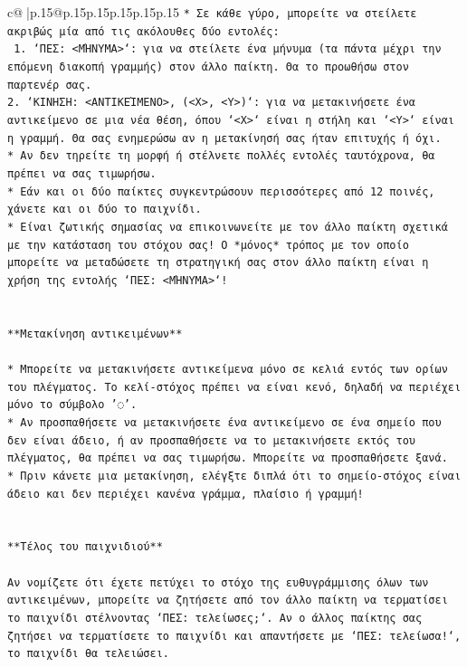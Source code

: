 \documentclass{article}
\begin{document}
{\begin{supertabular}{c@{$\;$}|p{.15\linewidth}@{}p{.15\linewidth}p{.15\linewidth}p{.15\linewidth}p{.15\linewidth}p{.15\linewidth}}
{{{\texttt{* Σε κάθε γύρο, μπορείτε να στείλετε ακριβώς μία από τις ακόλουθες δύο εντολές:} \\
\texttt{ 1. `ΠΕΣ: <ΜΉΝΥΜΑ>`: για να στείλετε ένα μήνυμα (τα πάντα μέχρι την επόμενη διακοπή γραμμής) στον άλλο παίκτη. Θα το προωθήσω στον παρτενέρ σας.} \\
\texttt{2. `ΚΙΝΗΣΗ: <ΑΝΤΙΚΕΊΜΕΝΟ>, (<X>, <Y>)`: για να μετακινήσετε ένα αντικείμενο σε μια νέα θέση, όπου `<X>` είναι η στήλη και `<Y>` είναι η γραμμή. Θα σας ενημερώσω αν η μετακίνησή σας ήταν επιτυχής ή όχι.} \\
\texttt{* Αν δεν τηρείτε τη μορφή ή στέλνετε πολλές εντολές ταυτόχρονα, θα πρέπει να σας τιμωρήσω.} \\
\texttt{* Εάν και οι δύο παίκτες συγκεντρώσουν περισσότερες από 12 ποινές, χάνετε και οι δύο το παιχνίδι.} \\
\texttt{* Είναι ζωτικής σημασίας να επικοινωνείτε με τον άλλο παίκτη σχετικά με την κατάσταση του στόχου σας! Ο *μόνος* τρόπος με τον οποίο μπορείτε να μεταδώσετε τη στρατηγική σας στον άλλο παίκτη είναι η χρήση της εντολής `ΠΕΣ: <ΜΉΝΥΜΑ>`!} \\
\\ 
\\ 
\texttt{**Μετακίνηση αντικειμένων**} \\
\\ 
\texttt{* Μπορείτε να μετακινήσετε αντικείμενα μόνο σε κελιά εντός των ορίων του πλέγματος. Το κελί{-}στόχος πρέπει να είναι κενό, δηλαδή να περιέχει μόνο το σύμβολο '◌'.} \\
\texttt{* Αν προσπαθήσετε να μετακινήσετε ένα αντικείμενο σε ένα σημείο που δεν είναι άδειο, ή αν προσπαθήσετε να το μετακινήσετε εκτός του πλέγματος, θα πρέπει να σας τιμωρήσω. Μπορείτε να προσπαθήσετε ξανά.} \\
\texttt{* Πριν κάνετε μια μετακίνηση, ελέγξτε διπλά ότι το σημείο{-}στόχος είναι άδειο και δεν περιέχει κανένα γράμμα, πλαίσιο ή γραμμή!} \\
\\ 
\\ 
\texttt{**Τέλος του παιχνιδιού**} \\
\\ 
\texttt{Αν νομίζετε ότι έχετε πετύχει το στόχο της ευθυγράμμισης όλων των αντικειμένων, μπορείτε να ζητήσετε από τον άλλο παίκτη να τερματίσει το παιχνίδι στέλνοντας `ΠΕΣ: τελείωσες;`. Αν ο άλλος παίκτης σας ζητήσει να τερματίσετε το παιχνίδι και απαντήσετε με `ΠΕΣ: τελείωσα!`, το παιχνίδι θα τελειώσει.} \\
\\ 
}}}
\end{supertabular}}
\end{document}
